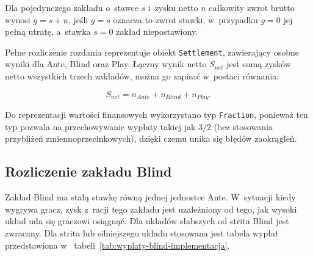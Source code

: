 Dla pojedynczego zakładu
o~stawce \(s\) i~zysku netto \(n\) całkowity zwrot brutto wynosi
\(g = s + n\), jeśli \(g = s\) oznacza to zwrot stawki, w~przypadku \(g = 0\) jej pełną utratę, a~stawka \(s = 0\) zakład niepostawiony.

Pełne rozliczenie rozdania reprezentuje obiekt \texttt{Settlement},
zawierający osobne wyniki dla Ante, Blind oraz Play.
Łączny wynik netto \(S_{net}\) jest sumą zysków netto wszystkich trzech zakładów, można go zapisać w~postaci równania:

\begin{equation}
    S_{net}
    =
    n_{Ante}
    +
    n_{Blind}
    +
    n_{Play}.
\end{equation}

Do reprezentacji wartości finansowych wykorzystano typ \texttt{Fraction}, ponieważ ten typ pozwala na
przechowywanie wypłaty takiej jak \(3/2\) (bez stosowania przybliżeń zmiennoprzecinkowych), dzięki czemu
unika się błędów zaokrągleń.


\subsection{Rozliczenie zakładu Blind}
\label{subsec:rozliczenie-blind}

Zakład Blind ma stałą stawkę równą jednej jednostce Ante. W~sytuacji kiedy wygrywa gracz,
zysk z~racji tego zakładu jest uzależniony od tego, jak wysoki układ uda się graczowi osiągnąć.
Dla układów słabszych od strita Blind jest zwracany. Dla strita lub
silniejszego układu stosowana jest tabela wypłat przedstawiona w~
tabeli~\ref{tab:wyplaty-blind-implementacja}.

